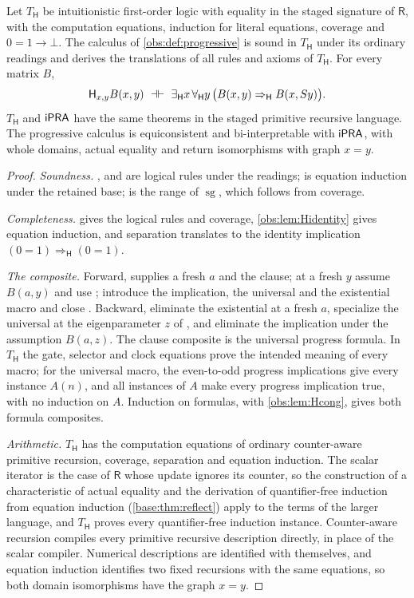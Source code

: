 \begin{theorem}
\label{obs:thm:progressive}
Let $T_{\mathsf{H}}$ be intuitionistic first-order logic with equality in the
staged signature of $\mathsf{R}$, with the computation equations, induction for
literal equations, coverage and $0=1\to\bot$. The calculus of
\cref{obs:def:progressive} is sound in $T_{\mathsf{H}}$ under its ordinary
readings and derives the translations of all rules and axioms of
$T_{\mathsf{H}}$. For every matrix $B$,
\[
\mathsf{H}_{x,y}B(x,y)\ \dashv\vdash\
\exists_{\mathsf{H}}x\,\forall_{\mathsf{H}}y\,\bigl(B(x,y)\Rightarrow_{\mathsf{H}}B(x,S y)\bigr).
\]
$T_{\mathsf{H}}$ and $\mathsf{iPRA}$ have the same theorems in the staged primitive
recursive language. The progressive calculus is equiconsistent and
bi-interpretable with $\mathsf{iPRA}$, with whole domains, actual equality and return
isomorphisms with graph $x=y$.
\end{theorem}

\begin{proof}
\emph{Soundness.} ,  and  are logical
rules under the readings; \rulename{Iter} is equation induction under the
retained base; \rulename{BoolCases} is the range of $\operatorname{sg}$, which
follows from coverage.

\emph{Completeness.}  gives the logical rules and
coverage, \cref{obs:lem:Hidentity} gives equation induction, and separation
translates to the identity implication
$(0=1)\Rightarrow_{\mathsf{H}}(0=1)$.

\emph{The composite.} Forward,  supplies a fresh $a$ and the
clause; at a fresh $y$ assume $B(a,y)$ and use \rulename{Step}; introduce the
implication, the universal and the existential macro and close \rulename{HE}.
Backward, eliminate the existential at a fresh $a$, specialize the universal
at the eigenparameter $z$ of \rulename{HI}, and eliminate the implication under
the assumption $B(a,z)$. The clause composite is the universal progress
formula. In $T_{\mathsf{H}}$ the gate, selector and clock equations prove the
intended meaning of every macro; for the universal macro, the even-to-odd
progress implications give every instance $A(n)$, and all instances of $A$ make
every progress implication true, with no induction on $A$. Induction on
formulas, with \cref{obs:lem:Hcong}, gives both formula composites.

\emph{Arithmetic.} $T_{\mathsf{H}}$ has the computation equations of ordinary
counter-aware primitive recursion, coverage, separation and equation
induction. The scalar iterator is the case of $\mathsf{R}$ whose update ignores
its counter, so the construction of a characteristic of actual equality and
the derivation of quantifier-free induction from equation induction
(\cref{base:thm:reflect}) apply to the terms of the larger language, and
$T_{\mathsf{H}}$ proves every quantifier-free induction instance.
Counter-aware recursion compiles every primitive recursive description
directly, in place of the scalar compiler. Numerical descriptions are
identified with themselves, and equation induction identifies two fixed
recursions with the same equations, so both domain isomorphisms have the graph
$x=y$.
\end{proof}

